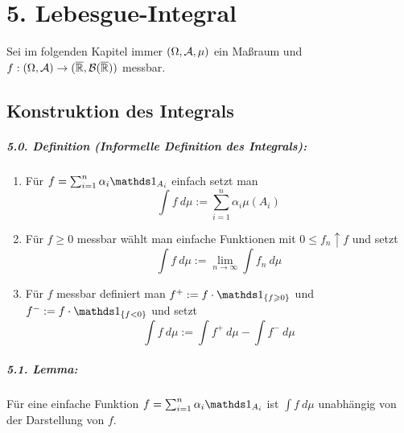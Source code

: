  \chapter*{5. Lebesgue-Integral}
 
 Sei im folgenden Kapitel immer $(\Omega,\mathcal{A},\mu)$ ein Ma\ss{}raum und $f:(\Omega,\mathcal{A})\to(\overline{\mathbb{R}},\mathcal{B}(\overline{\mathbb{R}}))$ messbar.
 
  \section*{Konstruktion des Integrals}
 
\paragraph{5.0. Definition (Informelle Definition des Integrals):}
\begin{enumerate}[label=(\roman*)]
    \item F\"ur $f=\sum_{i=1}^n \alpha_i\ind{A_i}$ einfach setzt man 
    $$\displaystyle\int f\ d\mu:=\sum_{i=1}^n\alpha_i\mu(A_i)$$
    \item F\"ur $f\geq0$ messbar w\"ahlt man einfache Funktionen mit $0\leq f_n\uparrow f$ und setzt
    $$\displaystyle\int f\ d\mu:=\lim_{n\to\infty}\int f_n\ d\mu$$
    \item F\"ur $f$ messbar definiert man $f^+:=f\cdot\ind{\{f\geq0\}}$ und $f^-:=f\cdot\ind{\{f< 0\}}$ und setzt
    $$\displaystyle\int f\ d\mu:=\int f^+\ d\mu-\int f^-\ d\mu$$
\end{enumerate}

\paragraph{5.1. Lemma:}F\"ur eine einfache Funktion $f=\sum_{i=1}^n\alpha_i\ind{A_i}$ ist $\int f\ d\mu$ unabh\"angig von der Darstellung von $f$.


